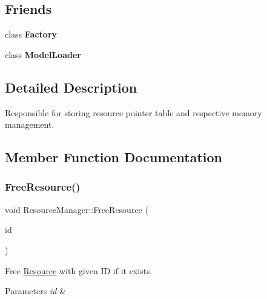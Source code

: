 \subsection*{Friends}
\begin{DoxyCompactItemize}
\item 
\mbox{\label{classResourceManager_a328c093d609680cca505905c6d49901a}} 
class {\bfseries Factory}
\item 
\mbox{\label{classResourceManager_ac22dade55c1e8f81ea3e0892cd321190}} 
class {\bfseries Model\+Loader}
\end{DoxyCompactItemize}


\subsection{Detailed Description}
Responsible for storing resource pointer table and respective memory management. 

\subsection{Member Function Documentation}
\mbox{\label{classResourceManager_a092d1668208e605a7aed842ca2c53f27}} 
\subsubsection{\texorpdfstring{Free\+Resource()}{FreeResource()}}
{\footnotesize\ttfamily void Resource\+Manager\+::\+Free\+Resource (\begin{DoxyParamCaption}\item[{\hyperlink{classStringId}{String\+Id}}]{id }\end{DoxyParamCaption})}



Free \hyperlink{structResource}{Resource} with given ID if it exists. 


\begin{DoxyParams}{Parameters}
{\em id} & \\
\hline
\end{DoxyParams}
\mbox{\label{classResourceManager_aad095f65eef966135684e8c6fcba76a6}} 
